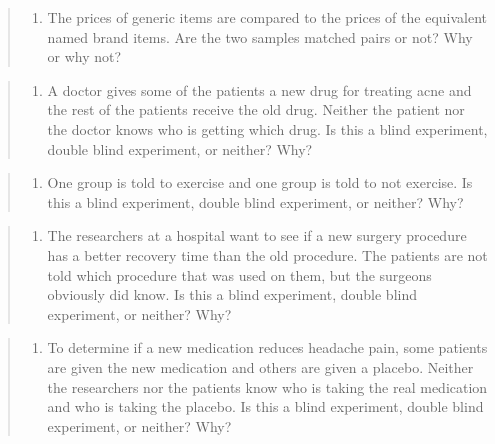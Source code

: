 \documentclass[]{book}
\providecommand{\tightlist}{%
  \setlength{\itemsep}{0pt}\setlength{\parskip}{0pt}}
\begin{document}
\begin{quote}
\begin{enumerate}
\def\labelenumi{\arabic{enumi}.}
\setcounter{enumi}{11}
\tightlist
\item
  The prices of generic items are compared to the prices of the equivalent named brand items. Are the two samples matched pairs or not? Why or why not?
\end{enumerate}
\end{quote}

\begin{quote}
\begin{enumerate}
\def\labelenumi{\arabic{enumi}.}
\setcounter{enumi}{12}
\tightlist
\item
  A doctor gives some of the patients a new drug for treating acne and the rest of the patients receive the old drug. Neither the patient nor the doctor knows who is getting which drug. Is this a blind experiment, double blind experiment, or neither? Why?
\end{enumerate}
\end{quote}

\begin{quote}
\begin{enumerate}
\def\labelenumi{\arabic{enumi}.}
\setcounter{enumi}{13}
\tightlist
\item
  One group is told to exercise and one group is told to not exercise. Is this a blind experiment, double blind experiment, or neither? Why?
\end{enumerate}
\end{quote}

\begin{quote}
\begin{enumerate}
\def\labelenumi{\arabic{enumi}.}
\setcounter{enumi}{14}
\tightlist
\item
  The researchers at a hospital want to see if a new surgery procedure has a better recovery time than the old procedure. The patients are not told which procedure that was used on them, but the surgeons obviously did know. Is this a blind experiment, double blind experiment, or neither? Why?
\end{enumerate}
\end{quote}

\begin{quote}
\begin{enumerate}
\def\labelenumi{\arabic{enumi}.}
\setcounter{enumi}{15}
\tightlist
\item
  To determine if a new medication reduces headache pain, some patients are given the new medication and others are given a placebo. Neither the researchers nor the patients know who is taking the real medication and who is taking the placebo. Is this a blind experiment, double blind experiment, or neither? Why?
\end{enumerate}
\end{quote}
\end{document}

